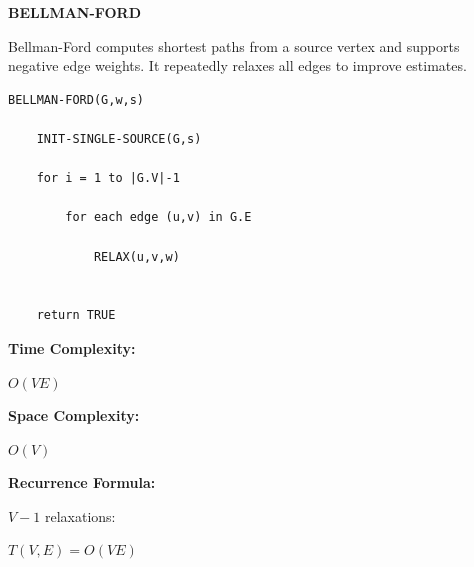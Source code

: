 \documentclass[a4paper,12pt]{article}
\begin{document}
\begin{tcolorbox}[
    colback=gray!30,
    colframe=black,
    boxrule=1pt,
    arc=0mm
]

\begin{tcolorbox}[
    colback=gray!10,
    colframe=black,
    arc=0mm
]
\centering
{\Huge\bfseries BELLMAN-FORD}
\end{tcolorbox}


\begin{tcolorbox}[
    colback=gray!10,
    colframe=black,
    arc=0mm
]
\small
Bellman-Ford computes shortest paths from a source vertex and supports
negative edge weights. It repeatedly relaxes all edges to improve estimates.
\end{tcolorbox}


\begin{tcolorbox}[
    colback=black!5,
    colframe=black,
    arc=0mm,
    title=Pseudo-code
]
\tiny
\begin{lstlisting}
BELLMAN-FORD(G,w,s)

    INIT-SINGLE-SOURCE(G,s)

    for i = 1 to |G.V|-1

        for each edge (u,v) in G.E

            RELAX(u,v,w)


    return TRUE
\end{lstlisting}
\end{tcolorbox}


\begin{tcolorbox}[
    colback=cyan!20,
    colframe=black,
    arc=0mm
]
\small
\textbf{Time Complexity:}

$O(VE)$
\end{tcolorbox}


\begin{tcolorbox}[
    colback=violet!20,
    colframe=black,
    arc=0mm
]
\small
\textbf{Space Complexity:}

$O(V)$
\end{tcolorbox}


\begin{tcolorbox}[
    colback=pink!20,
    colframe=black,
    arc=0mm
]
\small
\textbf{Recurrence Formula:}

$V-1$ relaxations:

$T(V,E)=O(VE)$
\end{tcolorbox}

\end{tcolorbox}
\end{document}
